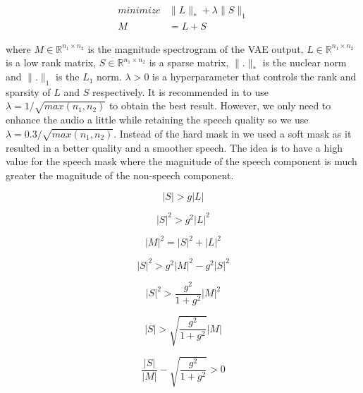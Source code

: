 \begin{equation}
\begin{aligned}
minimize & \parallel L \parallel_* + \lambda \parallel S \parallel_1   \\
M & = L + S
\end{aligned}
\end{equation}

where $M \in \mathbb{R}^{n_1 \times n_2}$ is the magnitude spectrogram of the VAE output, $L \in \mathbb{R}^{n_1 \times n_2}$ is a low rank matrix, $S \in \mathbb{R}^{n_1 \times n_2}$ is a sparse matrix, $\parallel . \parallel_*$ is the nuclear norm and $\parallel . \parallel_1$ is the $L_1$ norm. $\lambda > 0$ is a hyperparameter that controls the rank and sparsity of $L$ and $S$ respectively. It is recommended in \cite{6287816} to use $\lambda = 1/\sqrt{max(n_1,n_2)}$ to obtain the best result. However, we only need to enhance the audio a little while retaining the speech quality so we use $\lambda = 0.3/\sqrt{max(n_1,n_2)}$. Instead of the hard mask in \cite{6287816} we used a soft mask as it resulted in a better quality and a smoother speech. The idea is to have a high value for the speech mask where the magnitude of the speech component is much greater the magnitude of the non-speech component.

\begin{equation}
|S|  > g|L|
\end{equation}

\begin{equation}
|S|^2  > g^2 |L|^2
\end{equation}

\begin{equation}
|M|^2  = |S|^2 + |L|^2
\end{equation}

\begin{equation}
|S|^2  > g^2 |M|^2 - g^2|S|^2
\end{equation}

\begin{equation}
|S|^2  > \frac{g^2}{1 + g^2} |M|^2 
\end{equation}

\begin{equation}
|S|  > \sqrt{\frac{g^2}{1 + g^2}} |M|
\end{equation}

\begin{equation}
\frac{|S|}{|M|} - \sqrt{\frac{g^2}{1 + g^2}} > 0 
\end{equation}

